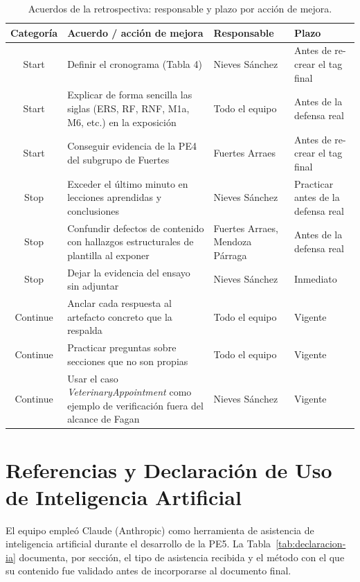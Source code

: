 \documentclass[journal,onecolumn]{IEEEtran}
\begin{document}
	\begin{table}[H]
		\centering
		\caption{Acuerdos de la retrospectiva: responsable y plazo por acción de mejora.}
		\label{tab:acuerdos-retro}
		\small
		\begin{tabularx}{\textwidth}{|c|X|L{2.7cm}|L{3.2cm}|}
			\hline
			\textbf{Categoría} & \textbf{Acuerdo / acción de mejora} & \textbf{Responsable} & \textbf{Plazo} \\
			\hline
			Start & Definir el cronograma (Tabla 4) & Nieves Sánchez & Antes de re-crear el tag final \\
			\hline
			Start & Explicar de forma sencilla las siglas (ERS, RF, RNF, M1a, M6, etc.) en la exposición & Todo el equipo & Antes de la defensa real \\
			\hline
			Start & Conseguir evidencia de la PE4 del subgrupo de Fuertes & Fuertes Arraes & Antes de re-crear el tag final \\
			\hline
			Stop & Exceder el último minuto en lecciones aprendidas y conclusiones & Nieves Sánchez & Practicar antes de la defensa real \\
			\hline
			Stop & Confundir defectos de contenido con hallazgos estructurales de plantilla al exponer & Fuertes Arraes, Mendoza Párraga & Antes de la defensa real \\
			\hline
			Stop & Dejar la evidencia del ensayo sin adjuntar & Nieves Sánchez & Inmediato \\
			\hline
			Continue & Anclar cada respuesta al artefacto concreto que la respalda & Todo el equipo & Vigente \\
			\hline
			Continue & Practicar preguntas sobre secciones que no son propias & Todo el equipo & Vigente \\
			\hline
			Continue & Usar el caso \textit{VeterinaryAppointment} como ejemplo de verificación fuera del alcance de Fagan & Nieves Sánchez & Vigente \\
			\hline
		\end{tabularx}
	\end{table}
	\section{Referencias y Declaración de Uso de Inteligencia Artificial}
	\label{app:ia_declaracion}
	
	\noindent El equipo empleó Claude (Anthropic) como herramienta de asistencia de
	inteligencia artificial durante el desarrollo de la PE5. La
	Tabla~\ref{tab:declaracion-ia} documenta, por sección, el tipo de
	asistencia recibida y el método con el que su contenido fue validado antes
	de incorporarse al documento final.
\end{document}
